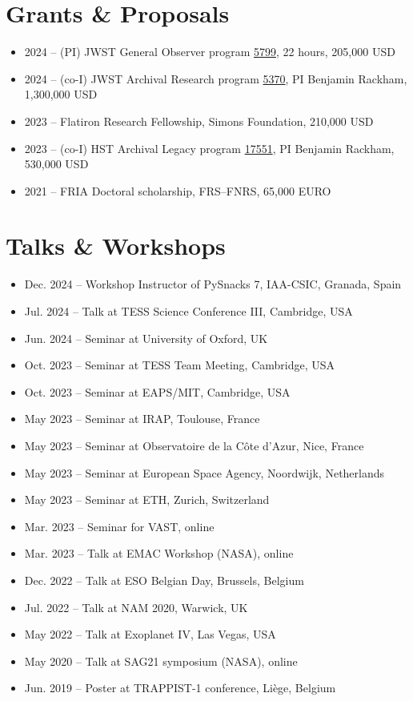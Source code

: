 \documentclass[10pt,letterpaper]{article}
\begin{document}
\section*{Grants \& Proposals}
\begin{itemize}
    \item 2024 -- (PI) JWST General Observer program \href{https://www.stsci.edu/jwst/science-execution/program-information?id=5799}{5799}, 22 hours, 205,000 USD
    \item 2024 -- (co-I) JWST Archival Research program \href{https://www.stsci.edu/jwst/science-execution/program-information?id=5370}{5370}, PI Benjamin Rackham, 1,300,000 USD
    \item 2023 -- Flatiron Research Fellowship, Simons Foundation, 210,000 USD
    \item 2023 -- (co-I) HST Archival Legacy program \href{https://www.stsci.edu/cgi-bin/get-proposal-info?id=17551&observatory=HST}{17551}, PI Benjamin Rackham, 530,000 USD
    \item 2021 -- FRIA Doctoral scholarship, FRS–FNRS, 65,000 EURO
\end{itemize}
\section*{Talks \& Workshops}
\begin{itemize}
    \item Dec. 2024 -- Workshop Instructor of PySnacks 7, IAA-CSIC, Granada, Spain
    \item Jul. 2024 -- Talk at TESS Science Conference III, Cambridge, USA
    \item Jun. 2024 -- Seminar at University of Oxford, UK
    \item Oct. 2023 -- Seminar at TESS Team Meeting, Cambridge, USA
    \item Oct. 2023 -- Seminar at EAPS/MIT, Cambridge, USA
    \item May 2023 -- Seminar at IRAP, Toulouse, France
    \item May 2023 -- Seminar at Observatoire de la Côte d'Azur, Nice, France
    \item May 2023 -- Seminar at European Space Agency, Noordwijk, Netherlands
    \item May 2023 -- Seminar at ETH, Zurich, Switzerland
    \item Mar. 2023 -- Seminar for VAST, online
    \item Mar. 2023 -- Talk at EMAC Workshop (NASA), online
    \item Dec. 2022 -- Talk at ESO Belgian Day, Brussels, Belgium
    \item Jul. 2022 -- Talk at NAM 2020, Warwick, UK
    \item May 2022 -- Talk at Exoplanet IV, Las Vegas, USA
    \item May 2020 -- Talk at SAG21 symposium (NASA), online
    \item Jun. 2019 -- Poster at TRAPPIST-1 conference, Liège, Belgium
\end{itemize}
\end{document}

